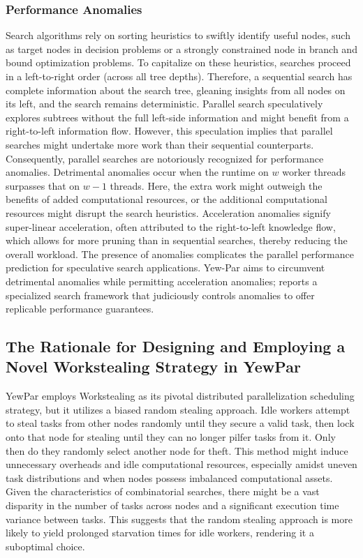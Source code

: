 \documentclass{mproj}
\begin{document}
\subsubsection{Performance Anomalies}
\label{sec:performance_anomalies}
Search algorithms rely on sorting heuristics to swiftly identify useful nodes,
such as target nodes in decision problems
or a strongly constrained node in branch and bound optimization problems.
To capitalize on these heuristics,
searches proceed in a left-to-right order (across all tree depths).
Therefore, a sequential search has complete information about the search tree,
gleaning insights from all nodes on its left, and the search remains deterministic.
Parallel search speculatively explores subtrees without the full left-side information and
might benefit from a right-to-left information flow.
However, this speculation implies that parallel searches might undertake more work
than their sequential counterparts.
Consequently, parallel searches are notoriously recognized for performance anomalies\cite{10.1007/3-540-60321-2_29}.
Detrimental anomalies occur when the runtime on \( w \) worker threads surpasses that on \( w-1 \) threads.
Here, the extra work might outweigh the benefits of added computational resources,
or the additional computational resources might disrupt the search heuristics.
Acceleration anomalies signify super-linear acceleration,
often attributed to the right-to-left knowledge flow,
which allows for more pruning than in sequential searches, thereby reducing the overall workload.
The presence of anomalies complicates the parallel performance prediction for speculative search applications.
Yew-Par aims to circumvent detrimental anomalies while permitting acceleration anomalies;
\cite{ARCHIBALD201892} reports a specialized search framework that judiciously controls anomalies
to offer replicable performance guarantees.

\subsection{The Rationale for Designing and Employing a Novel Workstealing Strategy in YewPar}
YewPar employs Workstealing as its pivotal distributed parallelization scheduling strategy,
but it utilizes a biased random stealing approach\cite{archibald2019yewpar}.
Idle workers attempt to steal tasks from other nodes randomly until they secure a valid task,
then lock onto that node for stealing until they can no longer pilfer tasks from it.
Only then do they randomly select another node for theft.
This method might induce unnecessary overheads and idle computational resources,
especially amidst uneven task distributions and when nodes possess imbalanced computational assets.
Given the characteristics of combinatorial searches,
there might be a vast disparity in the number of tasks across nodes and
a significant execution time variance between tasks.
This suggests that the random stealing approach is more likely to yield prolonged starvation times for idle workers,
rendering it a suboptimal choice.
\end{document}
